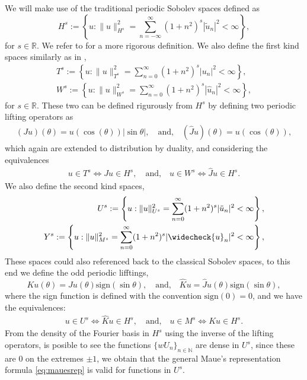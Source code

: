 \documentclass{article}
\newcommand{\IN}{{\mathbb N}}
\newcommand{\IR}{{\mathbb R}}
\begin{document}
We will make use of the traditional periodic Sobolev spaces defined as 
$$
H^s := \left\lbrace u : \| u\|_{H^s}^2 = \sum_{n=-\infty}^\infty (1+n^2)^s |\widetilde{u}_n|^2 < \infty \right\rbrace,
$$
for $s\in \IR$. We refer to \cite[Chapter 5]{saranen2013periodic} for a more rigorous definition. We also define the first kind spaces similarly as in \cite{Averseng2019},
\begin{align*}
T^s := \left\lbrace u : \| u\|_{T^s}^2 = \sum_{n=0}^\infty (1+n^2)^s |{u}_n|^2 < \infty \right\rbrace, \\
W^s := \left\lbrace u : \| u\|_{W^s}^2 = \sum_{n=0}^\infty (1+n^2)^s |\widehat{u}_n|^2 < \infty \right\rbrace,
\end{align*} 
for $s \in \IR$. These two can be defined rigurously from $H^s$ by defining two periodic lifting operators  as 
\begin{align}
\label{eq:liffings}
(Ju) (\theta) = u(\cos(\theta)) | \sin \theta|, \quad \text{and,} \quad
(\widehat{J}u)(\theta) = u (\cos(\theta)),
\end{align}
which again are extended to distribution by duality, and considering the equivalences 
\begin{align*}
u \in T^s \Leftrightarrow Ju \in H^s, \quad \text{and,} \quad u \in W^s \Leftrightarrow \widehat{J}u \in H^s.
\end{align*}
We also define the second kind spaces, 
\begin{align*}
U^s := \left\lbrace u : \| u\|_{U^s}^2 = \sum_{n=0}^\infty (1+n^2)^s |\ddot{u}_n|^2 < \infty \right\rbrace, \\
Y^s := \left\lbrace u : \| {u}\|_{M^s}^2 = \sum_{n=0}^\infty (1+n^2)^s |\widecheck{u}_n|^2 < \infty \right\rbrace,
\end{align*} 
These spaces could also referenced back to the classical Sobolev spaces, to this end we define the odd periodic lifftings, 
$$
Ku(\theta) = Ju(\theta) \text{sign}(\sin\theta), \quad \text{and,}\quad \widehat{K}u = \widehat{J}u(\theta) \text{sign}(\sin\theta),
$$
where the sign function is defined with the convention $\text{sign}(0)=0$, and we have the equivalences: 
\begin{align*}
u \in U^s \Leftrightarrow \widehat{K}u \in H^s, \quad \text{and,} \quad u \in M^s \Leftrightarrow Ku \in H^s.
\end{align*}
From the density of the Fourier basis in $H^s$ using the inverse of the lifting operators, is posible to see the functions $\{wU_n\}_{n \in \IN}$ are dense in $U^s$, since these are $0$
on the extremes $\pm 1$, we obtain that the general Maue's representation formula \eqref{eq:mauesrep} is valid for functions in $U^s$.  
\end{document}
